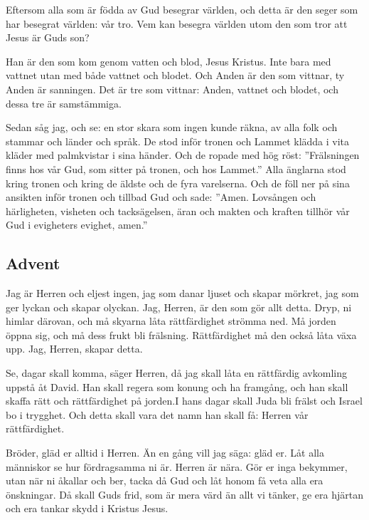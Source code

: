 \newpage
{}

Eftersom alla som är födda av Gud besegrar världen, och detta är den seger som har besegrat världen: vår tro.
Vem kan besegra världen utom den som tror att Jesus är Guds son?
 
Han är den som kom genom vatten och blod, Jesus Kristus. Inte bara med vattnet utan med både vattnet och blodet. Och Anden är den som vittnar, ty Anden är sanningen.
Det är tre som vittnar:
Anden, vattnet och blodet, och dessa tre är samstämmiga.


Sedan såg jag, och se: en stor skara som ingen kunde räkna, av alla folk och stammar och länder och språk. De stod inför tronen och Lammet klädda i vita kläder med palmkvistar i sina händer.
Och de ropade med hög röst: ”Frälsningen finns hos vår Gud, som sitter på tronen, och hos Lammet.”
Alla änglarna stod kring tronen och kring de äldste och de fyra varelserna. Och de föll ner på sina ansikten inför tronen och tillbad Gud
och sade: ”Amen. Lovsången och härligheten, visheten och tacksägelsen, äran och makten och kraften tillhör vår Gud i evigheters evighet, amen.”



\subsection{Advent}



Jag är Herren och eljest ingen, jag som danar ljuset och skapar mörkret, jag som ger lyckan och skapar olyckan. Jag, Herren, är den som gör allt detta.
Dryp, ni himlar därovan, och må skyarna låta rättfärdighet strömma ned. Må jorden öppna 
sig, och må dess frukt bli frälsning. Rättfärdighet må den också låta växa upp. Jag, Herren, skapar detta.



Se, dagar skall komma, säger Herren, då jag skall låta en rättfärdig avkomling uppstå åt David. Han skall regera som konung och ha framgång, och han skall skaffa rätt och rättfärdighet på jorden.I hans dagar skall Juda bli frälst och Israel bo i trygghet. Och detta skall vara det namn han skall få: Herren vår rättfärdighet.
 


 Bröder, gläd er alltid i Herren. Än en gång vill jag säga: gläd er. 
 Låt alla människor se hur fördragsamma ni är. Herren är nära. 
 Gör er inga bekymmer, utan när ni åkallar och ber, tacka då Gud och låt honom få veta alla era önskningar. 
 Då skall Guds frid, som är mera värd än allt vi tänker, ge era hjärtan och era tankar skydd i Kristus Jesus.





